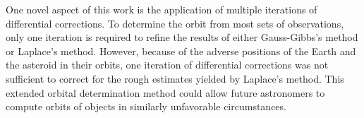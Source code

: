 \documentclass[12pt,journal,compsoc]{IEEEtran}
\begin{document}

One novel aspect of this work is the application of multiple iterations of differential corrections. 
To determine the orbit from most sets
of observations, only one iteration is required to refine the results of either Gauss-Gibbs's method or Laplace's method.
However, because of the adverse positions of the Earth and the asteroid in their orbits, 
one iteration of differential corrections was not sufficient to correct for the
rough estimates yielded by
Laplace's method. This extended orbital determination method could allow future astronomers to
compute orbits of objects in similarly unfavorable circumstances.

\end{document}
